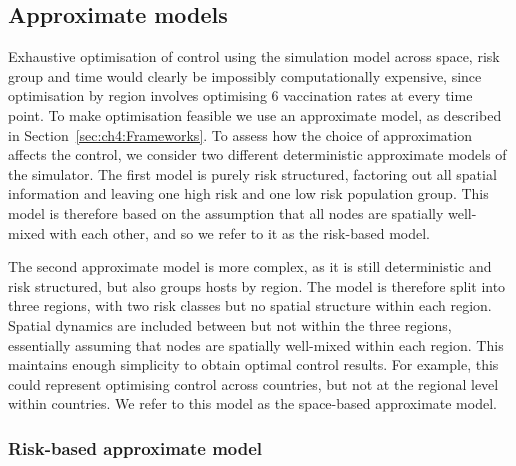 \subsection{Approximate models}

Exhaustive optimisation of control using the simulation model across space, risk group and time would clearly be impossibly computationally expensive, since optimisation by region involves optimising 6 vaccination rates at every time point. To make optimisation feasible we use an approximate model, as described in Section~\ref{sec:ch4:Frameworks}. To assess how the choice of approximation affects the control, we consider two different deterministic approximate models of the simulator. The first model is purely risk structured, factoring out all spatial information and leaving one high risk and one low risk population group. This model is therefore based on the assumption that all nodes are spatially well-mixed with each other, and so we refer to it as the risk-based model.

The second approximate model is more complex, as it is still deterministic and risk structured, but also groups hosts by region. The model is therefore split into three regions, with two risk classes but no spatial structure within each region. Spatial dynamics are included between but not within the three regions, essentially assuming that nodes are spatially well-mixed within each region. This maintains enough simplicity to obtain optimal control results. For example, this could represent optimising control across countries, but not at the regional level within countries. We refer to this model as the space-based approximate model.

\subsubsection*{Risk-based approximate model}

